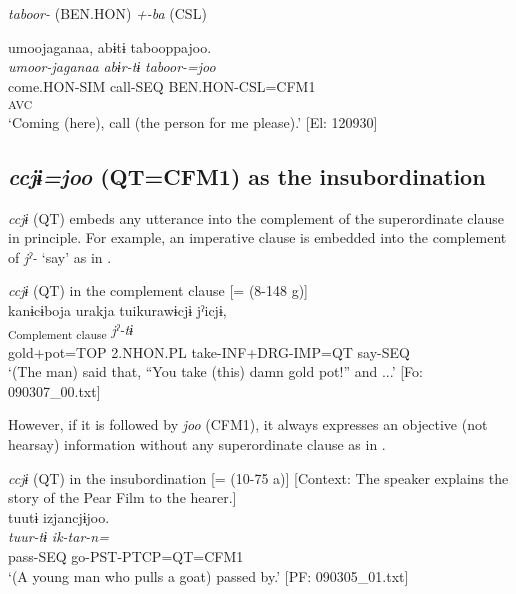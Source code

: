   \textit{taboor-} (BEN.HON) \textit{+-ba} (CSL)

  \ex  
      \gllll    umoojaganaa,  abɨtɨ  tabooppajoo.\\
      \textit{umoor-jaganaa}  \textit{abɨr-tɨ}  \textit{taboor-=joo}\\
      come.HON-SIM  call-SEQ  BEN.HON-CSL=CFM1\\
        [Lex. verb  Aux. verb]\textsubscript{AVC}\\
      \glt ‘Coming (here), call (the person for me please).’      [El: 120930]
\z
\z

\subsection{\textit{ccjɨ=joo} (QT=CFM1) as the insubordination}\label{sec:11.2.3}

\textit{ccjɨ} (QT) embeds any utterance into the complement of the superordinate clause in principle. For example, an imperative clause is embedded into the complement of \textit{jˀ-} ‘say’ as in .

\ea\label{ex:11-10}  \textit{ccjɨ} (QT) in the complement clause [= (8-148 g)]\\
  
      \glll    kanɨcɨboja  urakja  tuikurawɨcjɨ  jˀicjɨ,\\
    [\textit{kanɨ+cɨbo=ja}  \textit{urakja}  \textit{tur-i+kuraw-ɨ=\Highlight{ccjɨ}}]\textsubscript{Complement clause}  \textit{jˀ-tɨ}\\
    gold+pot=TOP  2.NHON.PL  take-INF+DRG-IMP=QT  say-SEQ\\
    \glt     ‘(The man) said that, “You take (this) damn gold pot!” and ...’ [Fo: 090307\_00.txt]
\z

However, if it is followed by \textit{joo} (CFM1), it always expresses an objective (not hearsay) information without any superordinate clause as in .

\ea\label{ex:11-11}  \textit{ccjɨ} (QT) in the insubordination [= (10-75 a)]   [Context: The speaker explains the story of the Pear Film to the hearer.]\\
  
      \glll    tuutɨ  izjancjɨjoo.\\
    \textit{tuur-tɨ}  \textit{ik-tar-n=}\\
    pass-SEQ  go-PST-PTCP=QT=CFM1\\
    \glt     ‘(A young man who pulls a goat) passed by.’ [PF: 090305\_01.txt]
\z

